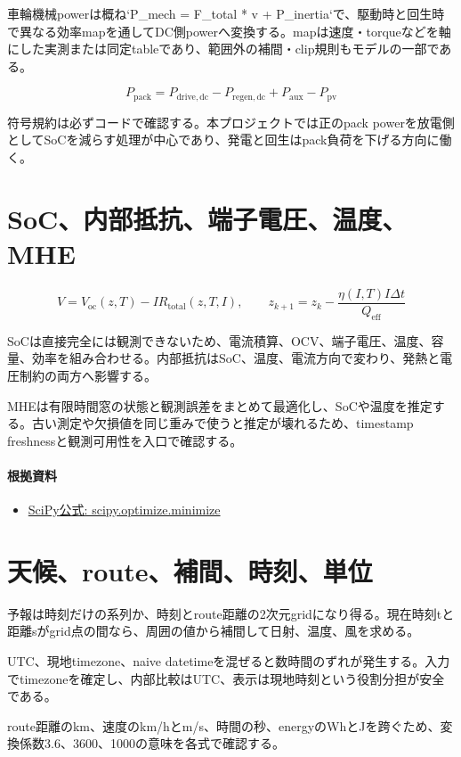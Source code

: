 \documentclass[a4paper,11pt]{article}
\begin{document}
車輪機械powerは概ね`P\_mech = F\_total * v + P\_inertia`で、駆動時と回生時で異なる効率mapを通してDC側powerへ変換する。mapは速度・torqueなどを軸にした実測または同定tableであり、範囲外の補間・clip規則もモデルの一部である。


\[
P_{\mathrm{pack}}=P_{\mathrm{drive,dc}}-P_{\mathrm{regen,dc}}+P_{\mathrm{aux}}-P_{\mathrm{pv}}
\]

符号規約は必ずコードで確認する。本プロジェクトでは正のpack powerを放電側としてSoCを減らす処理が中心であり、発電と回生はpack負荷を下げる方向に働く。



\section{SoC、内部抵抗、端子電圧、温度、MHE}
\[
V=V_{\mathrm{oc}}(z,T)-IR_{\mathrm{total}}(z,T,I),\qquad z_{k+1}=z_k-\frac{\eta(I,T)I\Delta t}{Q_{\mathrm{eff}}}
\]

SoCは直接完全には観測できないため、電流積算、OCV、端子電圧、温度、容量、効率を組み合わせる。内部抵抗はSoC、温度、電流方向で変わり、発熱と電圧制約の両方へ影響する。


MHEは有限時間窓の状態と観測誤差をまとめて最適化し、SoCや温度を推定する。古い測定や欠損値を同じ重みで使うと推定が壊れるため、timestamp freshnessと観測可用性を入口で確認する。

\paragraph{根拠資料}
\begin{itemize}[leftmargin=1.6em]
\item \href{https://docs.scipy.org/doc/scipy/reference/generated/scipy.optimize.minimize.html}{SciPy公式: scipy.optimize.minimize}
\end{itemize}

\section{天候、route、補間、時刻、単位}
予報は時刻だけの系列か、時刻とroute距離の2次元gridになり得る。現在時刻tと距離sがgrid点の間なら、周囲の値から補間して日射、温度、風を求める。


UTC、現地timezone、naive datetimeを混ぜると数時間のずれが発生する。入力でtimezoneを確定し、内部比較はUTC、表示は現地時刻という役割分担が安全である。


route距離のkm、速度のkm/hとm/s、時間の秒、energyのWhとJを跨ぐため、変換係数3.6、3600、1000の意味を各式で確認する。
\end{document}
